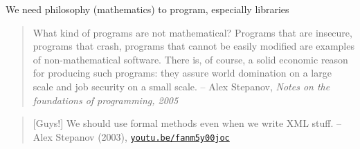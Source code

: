\begin{frame}[label=history3]{We need philosophy (mathematics) to program, especially libraries}
	\begin{quote}
		What kind of programs are not mathematical? Programs that are insecure, programs that
		crash, programs that cannot be easily modified are examples of non-mathematical software.
		There is, of course, a solid economic reason for producing such programs: they assure
		world domination on a large scale and job security on a small scale. -- Alex Stepanov, \emph{Notes on the foundations of programming, 2005}
	\end{quote}

	\noindent\makebox[\linewidth]{\resizebox{0.3333\linewidth}{1pt}{$\bullet$}}\pause

	\begin{quote}
		[Guys!] We should use formal methods even when we write XML stuff. -- Alex Stepanov (2003), \href{https://youtu.be/fanm5y00joc?t=6723}{\texttt{youtu.be/fanm5y00joc}}
	\end{quote}
\end{frame}


